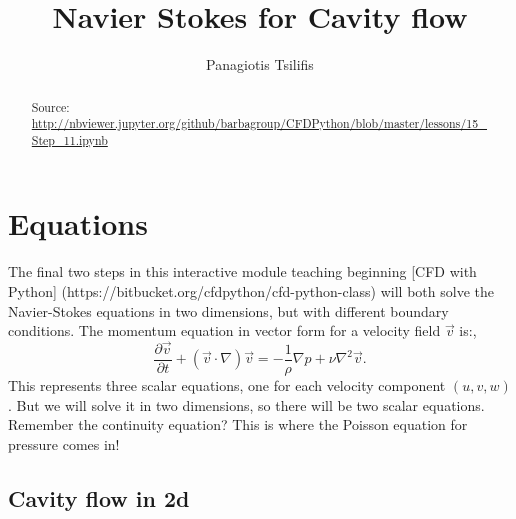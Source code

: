 \documentclass[11pt, sans]{amsart}
\title{Navier Stokes for Cavity flow}
\author{Panagiotis Tsilifis}
\begin{document}
\maketitle
\begin{abstract}
Source: {\color{blue}\url{http://nbviewer.jupyter.org/github/barbagroup/CFDPython/blob/master/lessons/15_Step_11.ipynb}}
\end{abstract}


\section{Equations}

The final two steps in this interactive module teaching beginning [CFD with Python] (https://bitbucket.org/cfdpython/cfd-python-class) will both solve the Navier-Stokes equations in two dimensions, but with different boundary conditions.
The momentum equation in vector form for a velocity field $\vec{v}$ is:,
\begin{equation}
\frac{\partial \vec{v}}{\partial t}+(\vec{v}\cdot\nabla)\vec{v}=-\frac{1}{\rho}\nabla p + \nu \nabla^2 \vec{v}.
\end{equation}
This represents three scalar equations, one for each velocity component $(u,v,w)$. But we will solve it in two dimensions, so there will be two scalar equations.
Remember the continuity equation? This is where the {\color{red}Poisson equation} for pressure comes in!

\subsection{Cavity flow in 2d}
\end{document}
